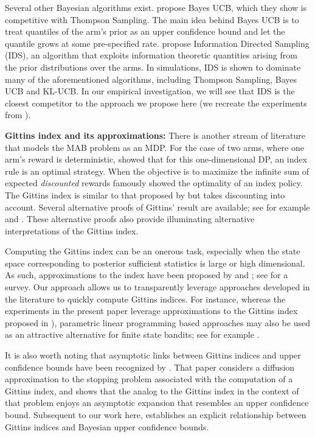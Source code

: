 Several other Bayesian algorithms exist. \cite{kaufmann2012thompson} propose Bayes UCB, which they show is competitive with Thompson Sampling. The main idea behind Bayes UCB is to treat quantiles of the arm's prior as an upper confidence bound and let the quantile grows at some pre-specified rate. \cite{russo2014learning} propose Information Directed Sampling (IDS), an algorithm that exploits information theoretic quantities arising from the prior distributions over the arms. In simulations, IDS is shown to dominate many of the aforementioned algorithms, including Thompson Sampling, Bayes UCB and KL-UCB. In our empirical investigation, we will see that IDS is the closest competitor to the approach we propose here (we recreate the experiments from \cite{russo2014learning}).

\noindent\textbf{\textsf{Gittins index and its approximations: }}
There is another stream of literature that models the MAB problem as an MDP. For the case of two arms, where one arm's reward is deterministic, \cite{bradt1956sequential} showed that for this one-dimensional DP, an index rule is an optimal strategy. When the objective is to maximize the infinite sum of expected \emph{discounted} rewards \cite{gittins1979bandit} famously showed the optimality of an index policy. The Gittins index is similar to that proposed by \cite{bradt1956sequential} but takes discounting into account. Several alternative proofs of Gittins' result are available; see for example \citep{tsitsiklis1994short,weber1992gittins,whittle1980multi} and \citep{bertsimas1996conservation}. These alternative proofs also provide illuminating alternative interpretations of the Gittins index.  
 
Computing the Gittins index can be an onerous task, especially when the state space corresponding to posterior sufficient statistics is large or high dimensional. As such, approximations to the index have been proposed by \cite{yao2006some,katehakis1987multi} and \cite{varaiya1985extensions}; see \citep{chakravorty2013multi} for a survey. {Our approach allows us to transparently leverage approaches developed in the literature to quickly compute Gittins indices. For instance, whereas the experiments in the present paper leverage approximations to the Gittins index proposed in \citep{brezzi2002optimal, powell2012optimal}), parametric linear programming based approaches may also be used as an attractive alternative for finite state bandits; see for example \citep{nino20072}.} 

{
It is also worth noting that asymptotic links between Gittins indices and upper confidence bounds have been recognized by \cite{fang1987characterization}. That paper considers a diffusion approximation to the stopping problem associated with the computation of a Gittins index, and shows that the analog to the Gittins index in the context of that problem enjoys an asymptotic expansion that resembles an upper confidence bound. Subsequent to our work here, \cite{russo2019note} establishes an explicit relationship between Gittins indices and Bayesian upper confidence bounds. 
}

